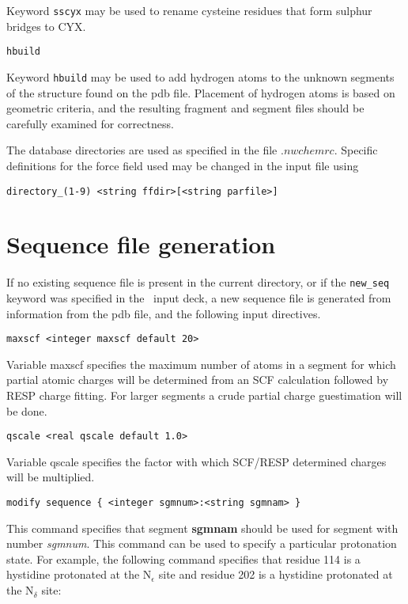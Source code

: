 Keyword \verb+sscyx+ may be used to rename cysteine residues that form
sulphur bridges to CYX.

\begin{verbatim}
hbuild
\end{verbatim}

Keyword \verb+hbuild+ may be used to add hydrogen atoms to the
unknown segments of the structure found on the pdb file. Placement
of hydrogen atoms is based on geometric criteria, and the resulting
fragment and segment files should be carefully examined for correctness.

The database directories are used as specified in the file $.nwchemrc$. Specific
definitions for the force field used may be changed in the input file using

\begin{verbatim}
directory_(1-9) <string ffdir>[<string parfile>]
\end{verbatim}

\section{Sequence file generation}

If no existing sequence file is present in the current directory,
or if the \verb+new_seq+ keyword was specified in the \prepare\ 
input deck, a new sequence file is generated from information
from the pdb file, and the following input directives.

\begin{verbatim}
maxscf <integer maxscf default 20>
\end{verbatim}

Variable maxscf specifies the maximum number of atoms in a segment for
which partial atomic charges will be determined from an SCF calculation
followed by RESP charge fitting. For larger segments a crude partial
charge guestimation will be done.

\begin{verbatim}
qscale <real qscale default 1.0>
\end{verbatim}

Variable qscale specifies the factor with which SCF/RESP determined
charges will be multiplied.

\begin{verbatim}
modify sequence { <integer sgmnum>:<string sgmnam> }
\end{verbatim}

This command specifies that segment {\bf sgmnam} should be used
for segment with number {\it sgmnum}. This command can be used
to specify a particular protonation state. For example, the
following command specifies that residue 114 is a hystidine
protonated at the N$_\epsilon$ site and residue 202 is a hystidine
protonated at the N$_\delta$ site:

